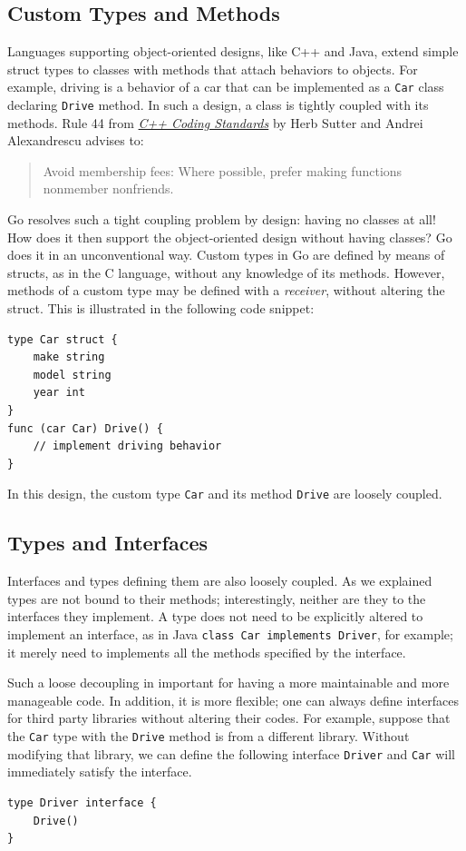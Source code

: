 \documentclass[11pt]{article}
\begin{document}
\subsection*{Custom Types and Methods}
\label{sec:orgheadline7}
Languages supporting object-oriented designs, like C++ and Java, extend simple struct types to classes with methods that attach behaviors to objects. For example, driving is a behavior of a car that can be implemented as a \texttt{Car} class declaring \texttt{Drive} method. In such a design, a class is tightly coupled with its methods. Rule 44 from \href{http://www.gotw.ca/publications/c++cs.htm}{\emph{C++ Coding Standards}} by Herb Sutter and Andrei Alexandrescu advises to:
\begin{quote}
Avoid membership fees: Where possible, prefer making functions nonmember nonfriends.
\end{quote}

Go resolves such a tight coupling problem by design: having no classes at all! How does it then support the object-oriented design without having classes? Go does it in an unconventional way. Custom types in Go are defined by means of structs, as in the C language, without any knowledge of its methods. However, methods of a custom type may be defined with a \emph{receiver}, without altering the struct. This is illustrated in the following code snippet:
\begin{verbatim}
type Car struct {
	make string
	model string
	year int
}
func (car Car) Drive() {
	// implement driving behavior
}
\end{verbatim}
In this design, the custom type \texttt{Car} and its method \texttt{Drive} are loosely coupled.

\subsection*{Types and Interfaces}
\label{sec:orgheadline8}
Interfaces and types defining them are also loosely coupled. As we explained types are not bound to their methods; interestingly, neither are they to the interfaces they implement. A type does not need to be explicitly altered to implement an interface, as in Java \texttt{class Car implements Driver}, for example; it merely need to implements all the methods specified by the interface.

Such a loose decoupling in important for having a more maintainable and more manageable code. In addition, it is more flexible; one can always define interfaces for third party libraries without altering their codes. For example, suppose that the \texttt{Car} type with the \texttt{Drive} method is from a different library. Without modifying that library, we can define the following interface \texttt{Driver} and \texttt{Car} will immediately satisfy the interface.
\begin{verbatim}
type Driver interface {
	Drive()
}
\end{verbatim}
\end{document}
